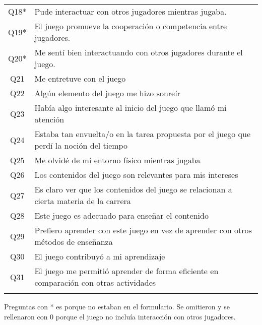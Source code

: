 \begin{table}[h]
\begin{tabular}{|c|l|}
Q18*     & Pude interactuar con otros jugadores mientras jugaba. \\
Q19*     & El juego promueve la cooperación o competencia entre jugadores. \\
Q20*     & Me sentí bien interactuando con otros jugadores durante el juego. \\
Q21     & Me entretuve con el juego \\
Q22      & Algún elemento del juego me hizo sonreír \\
Q23      & Había algo interesante al inicio del juego que llamó mi atención \\
Q24      & Estaba tan envuelta/o en la tarea propuesta por el juego que perdí la noción del tiempo \\
Q25      & Me olvidé de mi entorno físico mientras jugaba \\
Q26      & Los contenidos del juego son relevantes para mis intereses \\
Q27      & Es claro ver que los contenidos del juego se relacionan a cierta materia de la carrera \\
Q28      & Este juego es adecuado para enseñar el contenido \\
Q29      & Prefiero aprender con este juego en vez de aprender con otros métodos de enseñanza \\
Q30      & El juego contribuyó a mi aprendizaje \\
Q31      & El juego me permitió aprender de forma eficiente en comparación con otras actividades \\
& \\

\hline
\end{tabular}
\vspace{0.5em} %
\par
Preguntas con * es porque no estaban en el formulario. Se omitieron y se rellenaron con 0 porque el juego no incluía interacción con otros jugadores.

\end{table}

\restoregeometry
